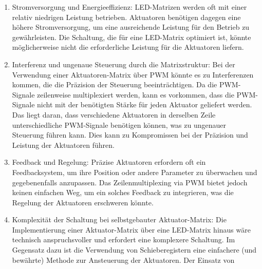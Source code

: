 \begin{enumerate}
	\item Stromversorgung und Energieeffizienz: LED-Matrizen werden oft mit einer relativ niedrigen Leistung betrieben. Aktuatoren benötigen dagegen eine höhere Stromversorgung,
	um eine ausreichende Leistung für den Betrieb zu gewährleisten. Die Schaltung, die für eine LED-Matrix optimiert ist,
	könnte möglicherweise nicht die erforderliche Leistung für die Aktuatoren liefern. %
	\item Interferenz und ungenaue Steuerung durch die Matrixstruktur: Bei der Verwendung einer Aktuatoren-Matrix über \ac{PWM}
	könnte es zu Interferenzen kommen, die die Präzision der Steuerung beeinträchtigen. Da die \ac{PWM}-Signale zeilenweise
	multiplexiert werden, kann es vorkommen, dass die \ac{PWM}-Signale nicht mit der benötigten Stärke für jeden Aktuator geliefert
	werden. Das liegt daran, dass verschiedene Aktuatoren in derselben Zeile unterschiedliche \ac{PWM}-Signale benötigen können,
	was zu ungenauer Steuerung führen kann. Dies kann zu Kompromissen bei der Präzision und Leistung der Aktuatoren führen. %
	\item Feedback und Regelung: Präzise Aktuatoren erfordern oft ein Feedbacksystem, um ihre Position oder andere Parameter
	zu überwachen und gegebenenfalls anzupassen. Das Zeilenmultiplexing via \ac{PWM} bietet jedoch keinen einfachen Weg, um ein
	solches Feedback zu integrieren, was die Regelung der Aktuatoren erschweren könnte. %
	\item Komplexität der Schaltung bei selbstgebauter Aktuator-Matrix: Die Implementierung einer Aktuator-Matrix über eine
	LED-Matrix hinaus wäre technisch anspruchsvoller und erfordert eine komplexere Schaltung. Im Gegensatz dazu ist die
	Verwendung von Schieberegistern eine einfachere (und bewährte) Methode zur Ansteuerung der Aktuatoren. Der Einsatz von %

\end{enumerate}
